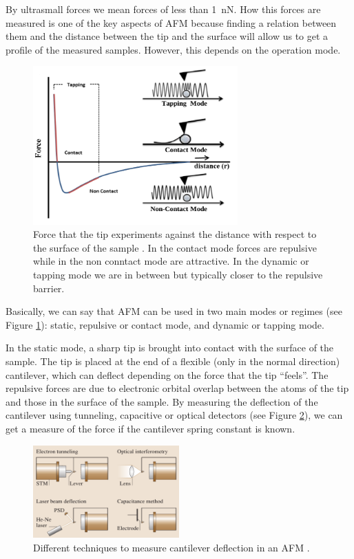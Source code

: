 \documentclass[11pt,a4paper]{article}
\begin{document}
By ultrasmall forces we mean forces of less than \SI{1}{\nano\N}. How this forces are measured is one of the key aspects of AFM because finding a relation between them and the distance between the tip and the surface will allow us to get a profile of the measured samples. However, this depends on the operation mode.

\begin{figure}[ht]
\centering
\includegraphics[width=0.7\textwidth]{AFM_modes}
\caption{Force that the tip experiments against the distance with respect to the surface of the sample \cite{jfb8010007}. In the contact mode forces are repulsive while in the non conntact mode are attractive. In the dynamic or tapping mode we are in between but typically closer to the repulsive barrier.}
\label{fig:AFM_modes}
\end{figure}

Basically, we can say that AFM can be used in two main modes or regimes (see Figure \ref{fig:AFM_modes}): static, repulsive or contact mode, and dynamic or tapping mode.

In the static mode, a sharp tip is brought into contact with the surface of the sample. The tip is placed at the end of a flexible (only in the normal direction) cantilever, which can deflect depending on the force that the tip ``feels''. The repulsive forces are due to electronic orbital overlap between the atoms of the tip and those in the surface of the sample. By measuring the deflection of the cantilever using tunneling, capacitive or optical detectors (see Figure \ref{fig:Deflection_measurement}), we can get a measure of the force if the cantilever spring constant is known.

\begin{figure}[ht]
\centering
\includegraphics[width=0.5\textwidth]{Deflection}
\caption{Different techniques to measure cantilever deflection in an AFM \cite{Bhushan}.}
\label{fig:Deflection_measurement}
\end{figure}
\end{document}
